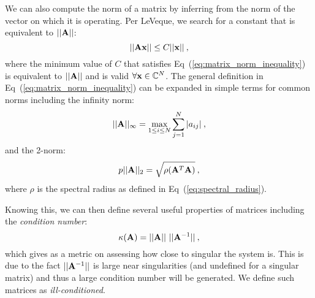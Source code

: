 We can also compute the norm of a matrix by inferring from the norm of
the vector on which it is operating. Per LeVeque, we search for a
constant that is equivalent to $||\mathbf{A}||$:
\begin{equation}
  ||\mathbf{A}\mathbf{x}|| \leq C ||\mathbf{x}||\:,
  \label{eq:matrix_norm_inequality}
\end{equation}
where the minimum value of $C$ that satisfies
Eq~(\ref{eq:matrix_norm_inequality}) is equivalent to $||\mathbf{A}||$
and is valid $\forall \mathbf{x} \in \mathbb{C}^N$. The general
definition in Eq~(\ref{eq:matrix_norm_inequality}) can be expanded in
simple terms for common norms including the infinity norm:
\begin{equation}
  ||\mathbf{A}||_{\infty} = \max_{1 \leq i \leq N} \sum^N_{j=1}|a_{ij}|\:,
  \label{eq:matrix_infinity_norm}
\end{equation}
and the 2-norm:
\begin{equation}
p  ||\mathbf{A}||_{2} = \sqrt{\rho(\mathbf{A}^T\mathbf{A})}\:,
  \label{eq:matrix_2_norm}
\end{equation}
where $\rho$ is the spectral radius as defined in
Eq~(\ref{eq:spectral_radius}).

Knowing this, we can then define several useful properties of matrices
including the \textit{condition number}:
\begin{equation}
  \kappa(\mathbf{A}) = ||\mathbf{A}||\ ||\mathbf{A}^{-1}||\:,
  \label{eq:condition_number}
\end{equation}
which gives as a metric on assessing how close to singular the system
is. This is due to the fact $||\mathbf{A}^{-1}||$ is large near
singularities (and undefined for a singular matrix) and thus a large
condition number will be generated. We define such matrices as
\textit{ill-conditioned}. 

